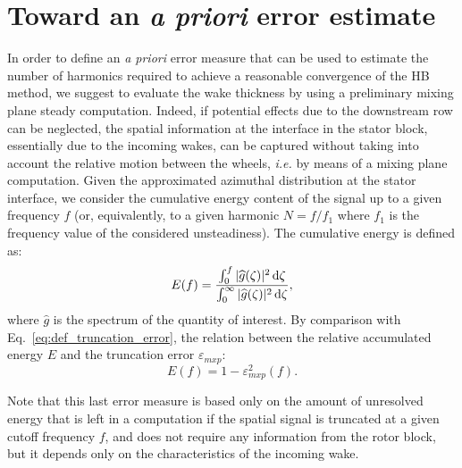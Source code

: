 \section{Toward an \emph{a priori} error estimate}
In order to define an \emph{a priori} error measure 
that can be used to estimate the number of 
harmonics required to achieve a reasonable 
convergence of the HB method, we suggest to 
evaluate the wake thickness by using a preliminary 
mixing plane steady computation. Indeed, if 
potential effects due to the downstream row can 
be neglected, the spatial information at the interface 
in the stator block, essentially due to the incoming 
wakes, can be captured without taking into account 
the relative motion between the wheels, \emph{i.e.} 
by means of a mixing plane computation. 
Given the approximated azimuthal distribution at 
the stator interface, we consider the cumulative
energy content of the signal up to a given frequency $f$ 
(or, equivalently, to a given harmonic $N=f/f_1$ where $f_1$ is the
frequency value of the considered unsteadiness). 
The cumulative energy is defined as:
\begin{equation}
    E(f) = \frac{
      \int_0^f | \widehat{g}(\zeta)|^2 \mathop{}\!\mathrm{d} \zeta
    }{
      \int_0^\infty | \widehat{g}(\zeta)|^2 \mathop{}\!\mathrm{d} \zeta
    },
\end{equation}
where $\widehat{g}$ is the spectrum of the quantity of interest.
By comparison with Eq.~\eqref{eq:def_truncation_error},
the relation between the relative accumulated energy $E$
and the truncation error $\varepsilon_{mxp}$:
\begin{equation}
    E(f) = 1 - \varepsilon_{mxp}^2 (f).
    \label{eq:correspond_E_error}
\end{equation}


Note that this last error measure is based only on 
the amount of unresolved energy that is left 
in a computation if the spatial signal is 
truncated at a given cutoff frequency $f$, 
and does not require any information from the rotor
block, but it depends only on the characteristics 
of the incoming wake.

